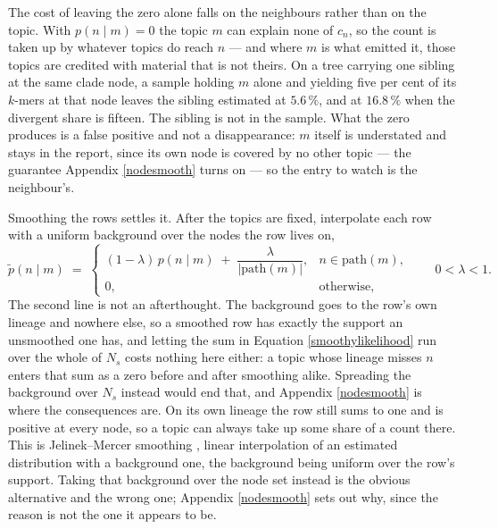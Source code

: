 \documentclass[pdflatex,sn-vancouver-num]{sn-jnl}
\begin{document}
    The cost of leaving the zero alone falls on the neighbours rather than on the topic. With
    $p(n \mid m) = 0$ the topic $m$ can explain none of $c_n$, so the count is taken up by whatever
    topics do reach $n$ --- and where $m$ is what emitted it, those topics are credited with material
    that is not theirs. On a tree carrying one sibling at the same clade node, a sample holding $m$
    alone and yielding five per cent of its $k$-mers at that node leaves the sibling estimated at
    $5.6\,\%$, and at $16.8\,\%$ when the divergent share is fifteen. The sibling is not in the
    sample. What the zero produces is a false positive and not a disappearance: $m$ itself is
    understated and stays in the report, since its own node is covered by no other topic --- the
    guarantee Appendix \ref{nodesmooth} turns on --- so the entry to watch is the neighbour's.

    Smoothing the rows settles it. After the topics are fixed, interpolate each row with a uniform
    background over the nodes the row lives on,
    \begin{equation}\label{smoothysmooth}
        \tilde{p}(n \mid m) \;=\;
        \begin{cases}
            (1 - \lambda)\, p(n \mid m) \;+\; \dfrac{\lambda}{\lvert \mathrm{path}(m) \rvert} ,
                & n \in \mathrm{path}(m) , \\[2.2ex]
            0 , & \text{otherwise} ,
        \end{cases}
        \qquad 0 < \lambda < 1 .
    \end{equation}
    The second line is not an afterthought. The background goes to the row's own lineage and nowhere
    else, so a smoothed row has exactly the support an unsmoothed one has, and letting the sum in
    Equation \eqref{smoothylikelihood} run over the whole of $N_s$ costs nothing here either: a topic
    whose lineage misses $n$ enters that sum as a zero before and after smoothing alike. Spreading
    the background over $N_s$ instead would end that, and Appendix \ref{nodesmooth} is where the
    consequences are. On its own lineage the row still sums to one and is positive at every node, so
    a topic can always take up some share of a count there. This is
    Jelinek--Mercer smoothing \citep{jelinekmercer}, linear interpolation of an estimated
    distribution with a background one, the background being uniform over the row's support. Taking
    that background over the node set instead is the obvious alternative and the wrong one;
    Appendix \ref{nodesmooth} sets out why, since the reason is not the one it appears to be.
\end{document}
